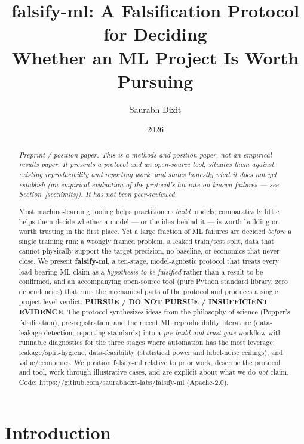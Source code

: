 \documentclass[11pt]{article}
\title{\textbf{falsify-ml}: A Falsification Protocol for Deciding\\
Whether an ML Project Is Worth Pursuing}
\author{Saurabh Dixit}
\date{2026}
\begin{document}
\maketitle

\begin{abstract}
\noindent\textit{Preprint / position paper. This is a methods-and-position paper, not an empirical
results paper. It presents a protocol and an open-source tool, situates them against existing
reproducibility and reporting work, and states honestly what it does \emph{not} yet establish (an
empirical evaluation of the protocol's hit-rate on known failures --- see Section~\ref{sec:limits}).
It has not been peer-reviewed.}

\medskip
\noindent Most machine-learning tooling helps practitioners \emph{build} models; comparatively little
helps them decide whether a model --- or the idea behind it --- is worth building or worth trusting
in the first place. Yet a large fraction of ML failures are decided \emph{before} a single training
run: a wrongly framed problem, a leaked train/test split, data that cannot physically support the
target precision, no baseline, or economics that never close. We present \textbf{falsify-ml}, a
ten-stage, model-agnostic protocol that treats every load-bearing ML claim as a \emph{hypothesis to
be falsified} rather than a result to be confirmed, and an accompanying open-source tool (pure Python
standard library, zero dependencies) that runs the mechanical parts of the protocol and produces a
single project-level verdict: \textbf{PURSUE / DO NOT PURSUE / INSUFFICIENT EVIDENCE}. The protocol
synthesizes ideas from the philosophy of science (Popper's falsification), pre-registration, and the
recent ML reproducibility literature (data-leakage detection; reporting standards) into a
\emph{pre-build and trust-gate} workflow with runnable diagnostics for the three stages where
automation has the most leverage: leakage/split-hygiene, data-feasibility (statistical power and
label-noise ceilings), and value/economics. We position falsify-ml relative to prior work, describe
the protocol and tool, work through illustrative cases, and are explicit about what we do \emph{not}
claim. Code: \url{https://github.com/saurabhdxt-labs/falsify-ml} (Apache-2.0).
\end{abstract}

\section{Introduction}
\end{document}
